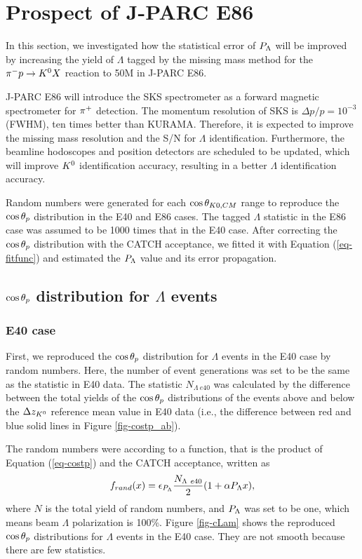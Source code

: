 \section{Prospect of J-PARC E86}
\label{sec-prospect}

In this section, we investigated how the statistical error of $P_{\Lambda}$ will be improved by increasing the yield of $\Lambda$ tagged by the missing mass method for the $\pi^- p \to K^0 X$ reaction to 50M in J-PARC E86. 

J-PARC E86 will introduce the SKS spectrometer \cite{K1.8} as a forward magnetic spectrometer for $\pi^{+}$ detection. The momentum resolution of SKS is $\Delta p/p=10^{-3}$ (FWHM), ten times better than KURAMA. Therefore, it is expected to improve the missing mass resolution and the S/N for $\Lambda$ identification. Furthermore, the beamline hodoscopes and position detectors are scheduled to be updated, which will improve $K^{0}$ identification accuracy, resulting in a better $\Lambda$ identification accuracy.

Random numbers were generated for each $\cos{\theta_{K0,CM}}$ range to reproduce the $\cos{\theta_p}$ distribution in the E40 and E86 cases. The tagged $\Lambda$ statistic in the E86 case was assumed to be 1000 times that in the E40 case. After correcting the $\cos{\theta_p}$ distribution with the CATCH acceptance, we fitted it with Equation (\ref{eq-fitfunc}) and estimated the $P_{\Lambda}$ value and its error propagation.

\subsection{$\cos{\theta_p}$ distribution for $\Lambda$ events}
\label{subsec-randcostpLam}
\subsubsection{E40 case}
First, we reproduced the $\cos{\theta_p}$ distribution for $\Lambda$ events in the E40 case by random numbers. Here, the number of event generations was set to be the same as the statistic in E40 data. The statistic $N_{\Lambda\ e40}$ was calculated by the difference between the total yields of the $\cos{\theta_p}$ distributions of the events above and below the $\Delta z_{K^{0}}$ reference mean value in E40 data (i.e., the difference between red and blue solid lines in Figure \ref{fig-costp_ab}).

The random numbers were according to a function, that is the product of Equation (\ref{eq-costp}) and the CATCH acceptance, written as
\begin{equation}
  f_{rand}(x) = \epsilon_{P_{\Lambda}} \frac{N_{\Lambda\ e40}}{2}(1+\alpha P_{\Lambda} x),
  \label{eq-randfunc}
\end{equation}
where $N$ is the total yield of random numbers, and $P_{\Lambda}$ was set to be one, which means beam $\Lambda$ polarization is 100\%.  Figure \ref{fig-cLam} shows the reproduced $\cos{\theta_p}$ distributions for $\Lambda$ events in the E40 case. They are not smooth because there are few statistics.

